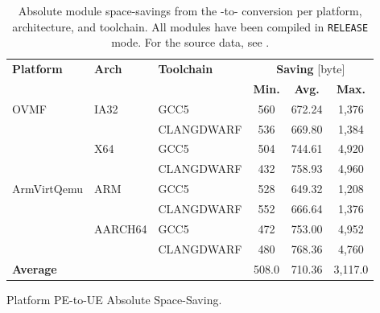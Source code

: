 \begin{table}[htbp]
  \centering
  \begin{tabular}{l l l c c c}
    \toprule
    \multirow{2}{*}[-2pt]{\textbf{Platform}} & \multirow{2}{*}[-2pt]{\textbf{Arch}} & \multirow{2}{*}[-2pt]{\textbf{Toolchain}} & \multicolumn{3}{c}{\textbf{Saving} [byte]}\\
    \cmidrule{4-6}
     & & & \textbf{Min.} & \textbf{Avg.} & \textbf{Max.}\\
    \midrule
    \multirow{4}{*}[-2pt]{\gls{OVMF}} & \multirow{2}{*}{IA32} & GCC5 & 560 & 672.24 & 1,376\\
     & & CLANGDWARF & 536 & 669.80 & 1,384\\
    \cmidrule{2-6}
     & \multirow{2}{*}{X64} & GCC5 & 504 & 744.61 & 4,920\\
     & & CLANGDWARF & 432 & 758.93 & 4,960\\
    \midrule
    \multirow{4}{*}[-2pt]{\gls{ArmVirtQemu}} & \multirow{2}{*}{ARM} & GCC5 & 528 & 649.32 & 1,208\\
     & & CLANGDWARF & 552 & 666.64 & 1,376\\
    \cmidrule{2-6}
     & \multirow{2}{*}{AARCH64} & GCC5 & 472 & 753.00 & 4,952\\
     & & CLANGDWARF & 480 & 768.36 & 4,760\\
    \midrule
    \midrule
    \textbf{Average} & & & 508.0 & 710.36 & 3,117.0\\
    \bottomrule
  \end{tabular}
  \caption{Platform PE-to-UE Absolute Space-Saving.}
  \label{fig:abs_space_sav}
  \caption*{Absolute module space-savings from the -to- conversion per platform, architecture, and toolchain. All modules have been compiled in \texttt{RELEASE} mode. For the source data, see .}
\end{table}
